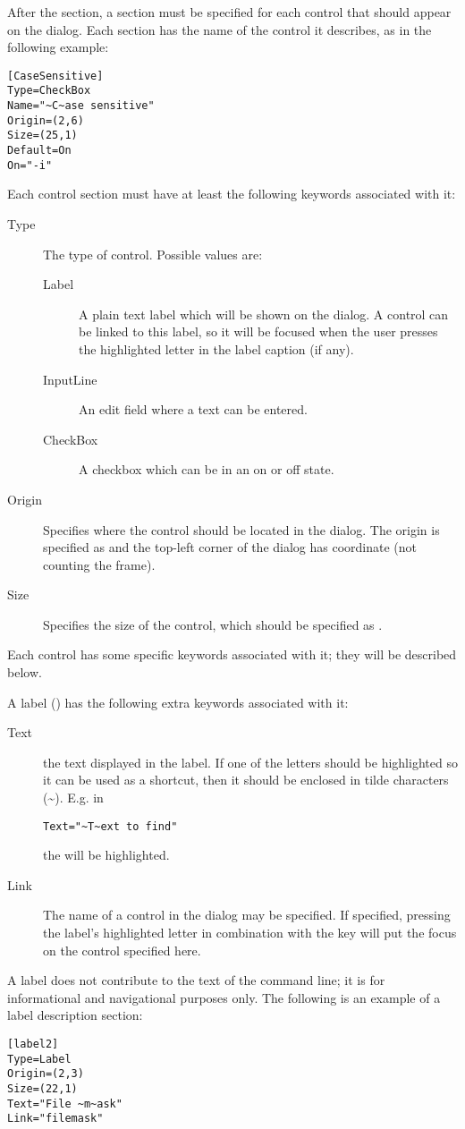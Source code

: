 After the  section, a section must be specified for each control that
should appear on the dialog. Each section has the name of the control it
describes, as in the following example:
\begin{verbatim}
[CaseSensitive]
Type=CheckBox
Name="~C~ase sensitive"
Origin=(2,6)
Size=(25,1)
Default=On
On="-i"
\end{verbatim}
Each control section  must have at least the following keywords associated
with it:
\begin{description}
\item[Type] The type of control. Possible values are:
\begin{description}
\item[Label] A plain text label which will be shown on the dialog.
A control can be linked to this label, so it will be focused when
the user presses the highlighted letter in the label caption (if any).
\item[InputLine] An edit field where a text can be entered.
\item[CheckBox] A checkbox which can be in an on or off state.
\end{description}
\item[Origin] Specifies where the control should be located in the dialog.
The origin is specified as  and the top-left corner of
the dialog has coordinate  (not counting the frame).
\item[Size] Specifies the size of the control, which should be specified
as .
\end{description}

Each control has some specific keywords associated with it;
they will be described below.

A label () has the following extra keywords associated
with it:
\begin{description}
\item[Text] the text displayed in the label. If one of the letters should
be highlighted so it can be used as a shortcut, then it should be enclosed
in tilde characters (\~{}). E.g. in
\begin{verbatim}
Text="~T~ext to find"
\end{verbatim}
the  will be highlighted.
\item[Link] The name of a control in the dialog may be specified.
If specified, pressing the label's highlighted letter in combination
with the  key will put the focus on the control specified here.
\end{description}
A label does not contribute to the text of the command line; it is for
informational and navigational purposes only. The following is an
example of a label description section:
\begin{verbatim}
[label2]
Type=Label
Origin=(2,3)
Size=(22,1)
Text="File ~m~ask"
Link="filemask"
\end{verbatim}

